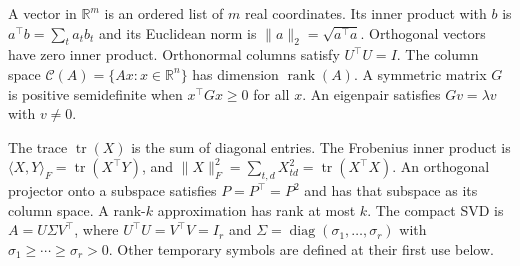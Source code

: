 \documentclass[11pt]{article}
\newcommand{\R}{\mathbb{R}}
\newcommand{\rank}{\operatorname{rank}}
\newcommand{\tr}{\operatorname{tr}}
\begin{document}
A vector in $\R^m$ is an ordered list of $m$ real coordinates. Its inner product
with $b$ is $a^\top b=\sum_t a_tb_t$ and its Euclidean norm is
$\|a\|_2=\sqrt{a^\top a}$. Orthogonal vectors have zero inner product.
Orthonormal columns satisfy $U^\top U=I$. The column space
$\mathcal C(A)=\{Ax:x\in\R^n\}$ has dimension $\rank(A)$.
A symmetric matrix $G$ is positive semidefinite when $x^\top Gx\ge0$ for all $x$.
An eigenpair satisfies $Gv=\lambda v$ with $v\ne0$.

The trace $\tr(X)$ is the sum of diagonal entries. The Frobenius inner product is
$\langle X,Y\rangle_F=\tr(X^\top Y)$, and
$\|X\|_F^2=\sum_{t,d}X_{td}^2=\tr(X^\top X)$.
An orthogonal projector onto a subspace satisfies $P=P^\top=P^2$ and has that
subspace as its column space. A rank-$k$ approximation has rank at most $k$.
The compact SVD is $A=U\Sigma V^\top$, where $U^\top U=V^\top V=I_r$ and
$\Sigma=\operatorname{diag}(\sigma_1,\ldots,\sigma_r)$ with
$\sigma_1\ge\cdots\ge\sigma_r>0$.
Other temporary symbols are defined at their first use below.

\clearpage
\end{document}
